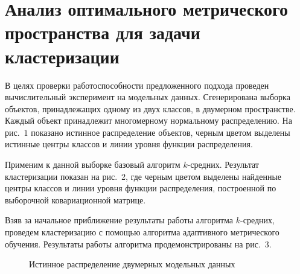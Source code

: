 \section{Анализ оптимального метрического пространства для задачи кластеризации}
\label{sec:ch5:exp_clustering}

В целях проверки работоспособности предложенного подхода проведен вычислительный эксперимент на модельных данных. Сгенерирована выборка объектов, принадлежащих одному из двух классов, в двумерном пространстве.
Каждый объект принадлежит многомерному нормальному распределению.
На рис.~$1$ показано истинное распределение объектов, черным цветом выделены истинные центры классов и линии уровня функции распределения.


Применим к данной выборке базовый алгоритм $k$-средних.
Результат кластеризации показан на рис.~2, где черным цветом выделены найденные центры классов и линии уровня функции распределения, построенной по выборочной ковариационной матрице.

Взяв за начальное приближение результаты работы алгоритма $k$-средних,
проведем клас\-те\-ри\-за\-цию с помощью алгоритма адаптивного метрического обучения.
Результаты работы алгоритма продемонстрированы на рис.~$3$.
\begin{figure}[ht]
    \caption{Истинное распределение двумерных модельных данных}
\end{figure}

